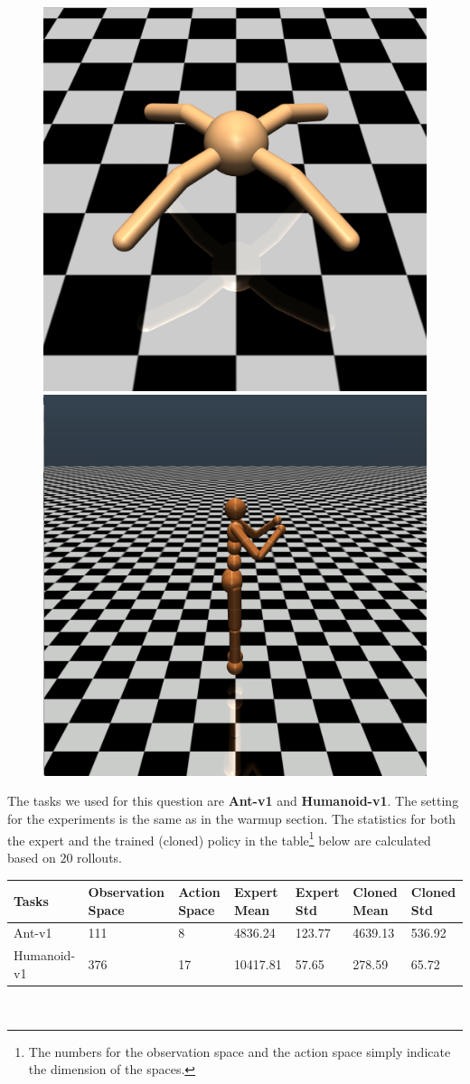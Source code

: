 \documentclass[a4paper]{article}
\theoremstyle{definition}
\begin{document}
\begin{figure}[H]
\centering
\begin{minipage}{.5\textwidth}
  \centering
  \includegraphics[width=0.4\linewidth]{Ant-v1.png}
\end{minipage}%
\hfill
\begin{minipage}{.5\textwidth}
  \centering
\includegraphics[width=0.4\linewidth]{Humanoid-v1.png}
\end{minipage}
\end{figure}

The tasks we used for this question are \textbf{Ant-v1} and \textbf{Humanoid-v1}. The setting for the experiments is the same as in the warmup section. The statistics for both the expert and the trained (cloned) policy in the table\footnote{The numbers for the observation space and the action space simply indicate the dimension of the spaces.} below are calculated based on $20$ rollouts.\\

\begin{center}
\begin{tabular}{ |p{2.1cm}||p{1.8cm}|p{1.8cm}|p{1.8cm}|p{1.8cm}|p{1.8cm}|p{1.8cm}| }
 \hline
 Tasks& Observation Space& Action Space& Expert Mean& Expert Std& Cloned Mean& Cloned Std\\
 \hline
 Ant-v1 &111 &8 &4836.24 &123.77 &4639.13 &536.92\\
 Humanoid-v1 &376 &17 &10417.81 &57.65   &278.59 &65.72\\
 \hline
\end{tabular}\\
\end{center}
\end{document}
